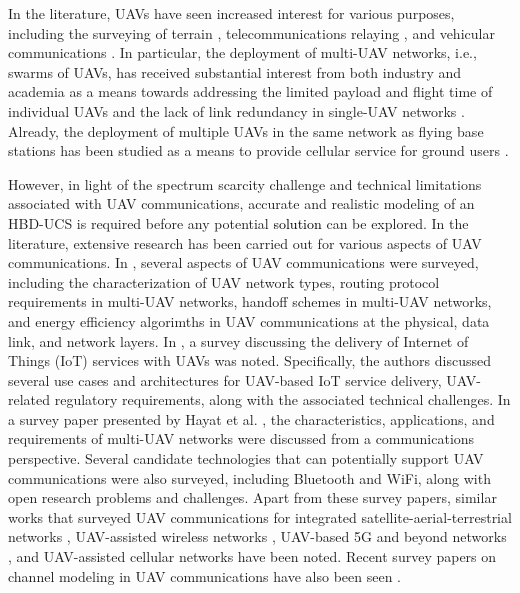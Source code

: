 In the literature, UAVs have seen increased interest for various purposes, including the surveying of terrain \cite{andre2014application}, telecommunications relaying \cite{azari2018ultra}, and vehicular communications \cite{xiao2018uav,xiao2018user}. In particular, the deployment of multi-UAV networks, i.e., swarms of UAVs, has received substantial interest from both industry and academia as a means towards addressing the limited payload and flight time of individual UAVs \cite{andre2014application} and the lack of link redundancy in single-UAV networks \cite{wang2017taking}. Already, the deployment of multiple UAVs in the same network as flying base stations has been studied as a means to provide cellular service for ground users \cite{mozaffari2017wireless}.

However, in light of the spectrum scarcity challenge and technical limitations associated with UAV communications, accurate and realistic modeling of an HBD-UCS is required before any potential \textcolor{black}{solution} can be explored. In the literature, extensive research has been carried out for various aspects of UAV communications. In \cite{gupta2015survey}, several aspects of UAV communications were surveyed, including the characterization of UAV network types, routing protocol requirements in multi-UAV networks, handoff schemes in multi-UAV networks, and energy efficiency algorimths in UAV communications at the physical, data link, and network layers. In \cite{motlagh2016low}, a survey discussing the delivery of Internet of Things (IoT) services with UAVs was noted. Specifically, the authors discussed several use cases and architectures for UAV-based IoT service delivery, UAV-related regulatory requirements, along with the associated technical challenges. In a survey paper presented by Hayat et al. \cite{hayat2016survey}, the characteristics, applications, and requirements of multi-UAV networks were discussed from a communications perspective. Several candidate technologies that can potentially support UAV communications were also surveyed, including Bluetooth and WiFi, along with open research problems and challenges. Apart from these survey papers, similar works that surveyed UAV communications for integrated satellite-aerial-terrestrial networks \cite{liu2018space,cao2018airborne}, UAV-assisted wireless networks \cite{mozaffari2019tutorial}, UAV-based 5G and beyond networks \cite{li2018uav}, and UAV-assisted cellular networks \cite{fotouhi2019survey} have been noted. Recent survey papers on channel modeling in UAV communications have also been seen \cite{khuwaja2018survey,khawaja2019survey}.

